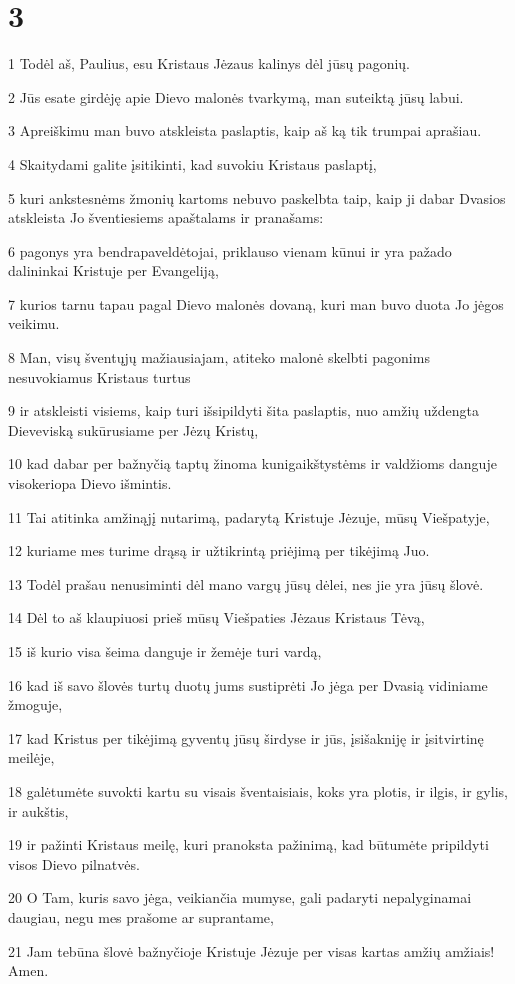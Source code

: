 \chapter{3}


\par 1 Todėl aš, Paulius, esu Kristaus Jėzaus kalinys dėl jūsų­ pagonių. 
\par 2 Jūs esate girdėję apie Dievo malonės tvarkymą, man suteiktą jūsų labui. 
\par 3 Apreiškimu man buvo atskleista paslaptis, kaip aš ką tik trumpai aprašiau. 
\par 4 Skaitydami galite įsitikinti, kad suvokiu Kristaus paslaptį, 
\par 5 kuri ankstesnėms žmonių kartoms nebuvo paskelbta taip, kaip ji dabar Dvasios atskleista Jo šventiesiems apaštalams ir pranašams: 
\par 6 pagonys yra bendrapaveldėtojai, priklauso vienam kūnui ir yra pažado dalininkai Kristuje per Evangeliją, 
\par 7 kurios tarnu tapau pagal Dievo malonės dovaną, kuri man buvo duota Jo jėgos veikimu. 
\par 8 Man, visų šventųjų mažiausiajam, atiteko malonė skelbti pagonims nesuvokiamus Kristaus turtus 
\par 9 ir atskleisti visiems, kaip turi išsipildyti šita paslaptis, nuo amžių uždengta Dieve­viską sukūrusiame per Jėzų Kristų,­ 
\par 10 kad dabar per bažnyčią taptų žinoma kunigaikštystėms ir valdžioms danguje visokeriopa Dievo išmintis. 
\par 11 Tai atitinka amžinąjį nutarimą, padarytą Kristuje Jėzuje, mūsų Viešpatyje, 
\par 12 kuriame mes turime drąsą ir užtikrintą priėjimą per tikėjimą Juo. 
\par 13 Todėl prašau nenusiminti dėl mano vargų jūsų dėlei, nes jie yra jūsų šlovė. 
\par 14 Dėl to aš klaupiuosi prieš mūsų Viešpaties Jėzaus Kristaus Tėvą, 
\par 15 iš kurio visa šeima danguje ir žemėje turi vardą, 
\par 16 kad iš savo šlovės turtų duotų jums sustiprėti Jo jėga per Dvasią vidiniame žmoguje, 
\par 17 kad Kristus per tikėjimą gyventų jūsų širdyse ir jūs, įsišakniję ir įsitvirtinę meilėje, 
\par 18 galėtumėte suvokti kartu su visais šventaisiais, koks yra plotis, ir ilgis, ir gylis, ir aukštis, 
\par 19 ir pažinti Kristaus meilę, kuri pranoksta pažinimą, kad būtumėte pripildyti visos Dievo pilnatvės. 
\par 20 O Tam, kuris savo jėga, veikiančia mumyse, gali padaryti nepalyginamai daugiau, negu mes prašome ar suprantame, 
\par 21 Jam tebūna šlovė bažnyčioje Kristuje Jėzuje per visas kartas amžių amžiais! Amen.


